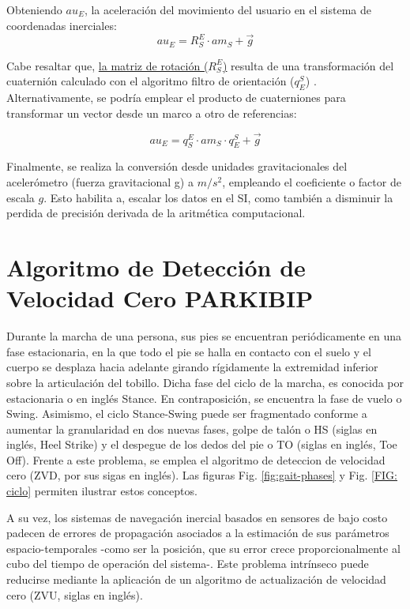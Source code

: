 \noindent Obteniendo $au_{E}$, la aceleración del movimiento del usuario en el sistema de coordenadas inerciales:
\begin{equation*}
    au_{E} = R_S^E \cdot am_{S} + \vec{g}
\end{equation*}  
    
\noindent Cabe resaltar que, \underline{la matriz de rotación ($R_S^E$)} resulta de una transformación del cuaternión calculado con el algoritmo filtro de orientación ($q_{E}^{S}$) . 
Alternativamente, se podría emplear el producto de cuaterniones para transformar un vector desde un marco a otro de referencias:

\begin{equation*}
    au_{E} = q_{S}^{E}\cdot am_{S} \cdot q_{E}^{S}  + \vec{g}
\end{equation*}

Finalmente, se realiza la conversión desde unidades gravitacionales del acelerómetro (fuerza gravitacional g) a  $m/s^2$, empleando el coeficiente o factor de escala $g$. Esto habilita a, escalar los datos en el \gls{SI}, como también a disminuir la perdida de precisión derivada de la aritmética computacional. 

\section{Algoritmo de Detección de Velocidad Cero PARKIBIP}
\label{zero-velocity-algorithm}

Durante la marcha de una persona, sus pies se encuentran periódicamente en una fase estacionaria, en la que todo el pie se halla en contacto con el suelo y el cuerpo se desplaza hacia adelante girando rígidamente la extremidad inferior sobre la articulación del tobillo. Dicha fase del ciclo de la marcha, es conocida por estacionaria o en inglés Stance. En contraposición, se encuentra la fase de vuelo o Swing. Asimismo, el ciclo Stance-Swing puede ser fragmentado conforme a aumentar la granularidad en dos nuevas fases, golpe de talón o HS (siglas en inglés, Heel Strike) y el despegue de los dedos del pie o TO (siglas en inglés, Toe Off). Frente a este problema, se emplea el algoritmo de deteccion de velocidad cero (ZVD, por sus sigas en inglés). Las figuras Fig. \ref{fig:gait-phases} y Fig. \ref{FIG: ciclo} permiten ilustrar estos conceptos.

A su vez, los sistemas de navegación inercial basados en sensores de bajo costo padecen de errores de propagación asociados a la estimación de sus parámetros espacio-temporales -como ser la posición, que su error crece proporcionalmente al cubo del tiempo de operación del sistema-. Este problema intrínseco puede reducirse mediante la aplicación de un algoritmo de actualización de velocidad cero (ZVU, siglas en inglés).

